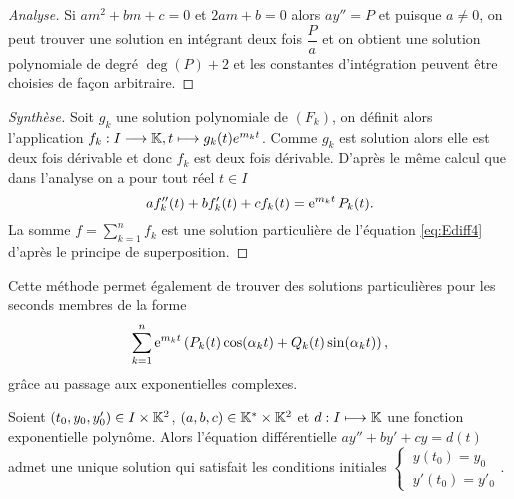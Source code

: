 \begin{proof}[Analyse]
Si \(am^2+bm+c = 0\) et \(2am+b = 0\) alors \(ay''=P\) et puisque \(a \neq 0\), on peut trouver une solution en intégrant deux fois \(\dfrac{P}{a}\) et on obtient une solution polynomiale de degré \(\deg(P)+2\) et les constantes d'intégration peuvent être choisies de façon arbitraire.
\end{proof}
\begin{proof}[Synthèse]
Soit \(g_k\) une solution polynomiale de \((F_k)\), on définit alors l'application \(f_k:I \longrightarrow \mathbb{K}, t \longmapsto g_k(t)e^{m_k t}\). Comme \(g_k\) est solution alors elle est deux fois dérivable et donc \(f_k\) est deux fois dérivable. D'après le même calcul que dans l'analyse on a pour tout réel \(t \in I\)
  \begin{equation}
    af_k''(t)+bf_k'(t)+cf_k(t)=\operatorname{e}^{m_k t} P_k(t).
  \end{equation}
La somme \(f=\sum_{k=1}^n f_k\) est une solution particulière de l'équation \eqref{eq:Ediff4} d'après le principe de superposition.
\end{proof}
%
Cette méthode permet également de trouver des solutions particulières pour les seconds membres de la forme
\begin{equation}
\sum_{k=1}^n \operatorname{e}^{m_k t} \left( P_k(t) \cos(\alpha_k t) +Q_k(t)\sin(\alpha_kt)\right),
\end{equation}
grâce au passage aux exponentielles complexes.
%
\begin{theo}
Soient \((t_0,y_0,y'_0) \in I \times \mathbb{K}^2\), \((a,b,c) \in \mathbb{K}^{*} \times \mathbb{K}^2\) et \(d: I \longmapsto \mathbb{K}\) une fonction exponentielle polynôme. Alors l'équation différentielle \(ay''+by'+cy=d(t)\) admet une unique solution qui satisfait les conditions initiales \( \left\{~\begin{array}{l} y(t_0)=y_0 \\ y'(t_0)=y'_0 \end{array}\right.\).
\end{theo}
